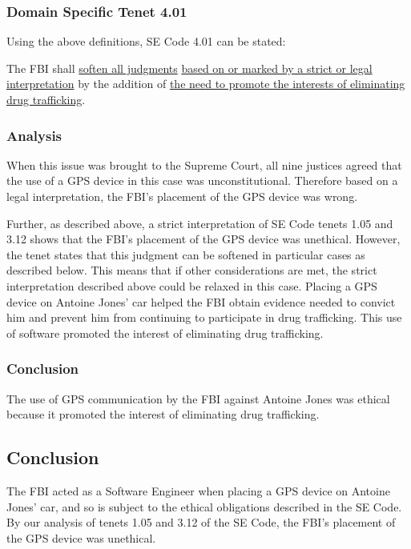 \documentclass[12pt]{article}
\newcounter{subsubsubsection}[subsubsection]
\begin{document}
\begin{multicols}{2}
\subsubsection{Domain Specific Tenet 4.01}
Using the above definitions, SE Code 4.01 can be stated: 
\begin{framed}
The FBI shall \uline{soften all judgments} \uline{based on or marked by a strict or legal interpretation} by the addition of \uline{the need to promote the interests of eliminating drug trafficking}.
\end{framed}
\subsubsection{Analysis}
When this issue was brought to the Supreme Court, all nine justices agreed that the use of a GPS device in this case was unconstitutional. \cite{usvjonesopinions}
Therefore based on a legal interpretation, the FBI's placement of the GPS device was wrong.

Further, as described above, a strict interpretation of SE Code tenets 1.05 and 3.12 shows that the FBI's placement of the GPS device was unethical.
However, the tenet states that this judgment can be softened in particular cases as described below.
This means that if other considerations are met, the strict interpretation described above could be relaxed in this case.
Placing a GPS device on Antoine Jones' car helped the FBI obtain evidence needed to convict him and prevent him from continuing to participate in drug trafficking. \cite{maynarddecision}
This use of software promoted the interest of eliminating drug trafficking.
\subsubsection{Conclusion}
The use of GPS communication by the FBI against Antoine Jones was ethical because it promoted the interest of eliminating drug trafficking.
\subsection{Conclusion}
The FBI acted as a Software Engineer when placing a GPS device on Antoine Jones' car, and so is subject to the ethical obligations described in the SE Code.
By our analysis of tenets 1.05 and 3.12 of the SE Code, the FBI's placement of the GPS device was unethical. 


\end{multicols}
\end{document}
